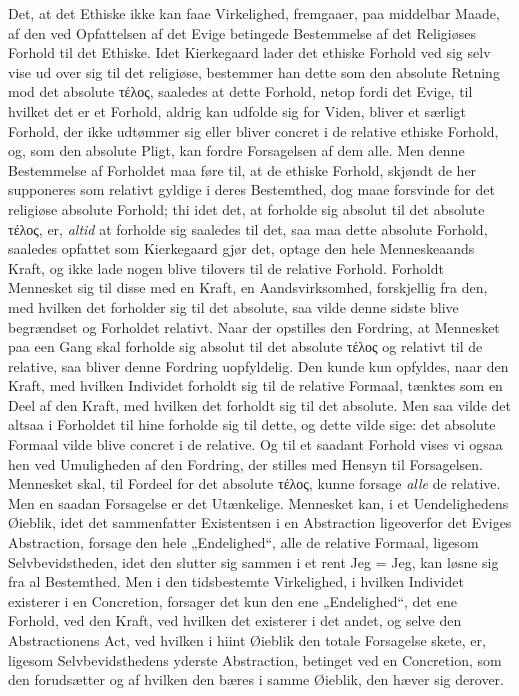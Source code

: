 \documentclass[12pt,a4paper]{book}
\newcommand{\opage}[1]{\marginnote{\footnotesize\textit{[#1]}}}
\begin{document}
Det, at det Ethiske ikke kan faae Virkelighed, fremgaaer, paa middelbar Maade, af den ved
Opfattelsen af det Evige betingede Bestemmelse af det Religiøses Forhold til det Ethiske. Idet
Kierkegaard lader det ethiske Forhold ved sig selv vise ud over sig til det religiøse, bestemmer
han dette som den absolute Retning mod det absolute τέλος, saaledes at dette Forhold, netop fordi
det Evige, til hvilket det er et Forhold, aldrig kan udfolde sig for Viden, bliver et særligt
Forhold, der ikke udtømmer sig eller bliver concret i de relative ethiske Forhold, og, som den
absolute Pligt, kan fordre Forsagelsen af dem alle. Men denne Bestemmelse af Forholdet maa føre
til, at de ethiske Forhold, skjøndt de her supponeres som relativt gyldige i deres Bestemthed,
dog maae forsvinde for det religiøse absolute Forhold; thi idet det, at forholde sig absolut til
det absolute τέλος, er, \emph{altid} at forholde sig saaledes til det, saa maa dette absolute Forhold,
saaledes opfattet som Kierkegaard gjør det, optage den hele Menneskeaands Kraft, og ikke lade
nogen blive tilovers til de relative Forhold. Forholdt Mennesket sig til disse med en Kraft, en
Aandsvirksomhed, forskjellig fra den, med hvilken det forholder sig til det absolute, saa vilde
denne sidste blive begrændset og Forholdet relativt. Naar der opstilles den Fordring, at
Mennesket paa een Gang skal forholde sig absolut til det absolute τέλος og relativt til de
relative, saa bliver denne Fordring uopfyldelig. Den kunde kun opfyldes, naar den Kraft, med
hvilken Individet forholdt sig til de relative Formaal, tænktes som en Deel af den Kraft, med
hvilken det forholdt sig til det absolute. Men saa vilde det altsaa i Forholdet til hine forholde
sig til dette, og dette vilde sige: det absolute Formaal vilde blive concret i de relative. Og
til et saadant Forhold vises vi ogsaa hen ved Umuligheden af den Fordring, der stilles med Hensyn
til Forsagelsen. Mennesket \opage{222}skal, til Fordeel for det absolute τέλος, kunne forsage \emph{alle} de
relative. Men en saadan Forsagelse er det Utænkelige. Mennesket kan, i et Uendelighedens
Øieblik, idet det sammenfatter Existentsen i en Abstraction ligeoverfor det Eviges Abstraction,
forsage den hele „Endelighed“, alle de relative Formaal, ligesom Selvbevidstheden, idet den
slutter sig sammen i et rent Jeg = Jeg, kan løsne sig fra al Bestemthed. Men i den tidsbestemte
Virkelighed, i hvilken Individet existerer i en Concretion, forsager det kun den ene
„Endelighed“, det ene Forhold, ved den Kraft, ved hvilken det existerer i det andet, og selve den
Abstractionens Act, ved hvilken i hiint Øieblik den totale Forsagelse skete, er, ligesom
Selvbevidsthedens yderste Abstraction, betinget ved en Concretion, som den forudsætter og af
hvilken den bæres i samme Øieblik, den hæver sig derover.
\end{document}
